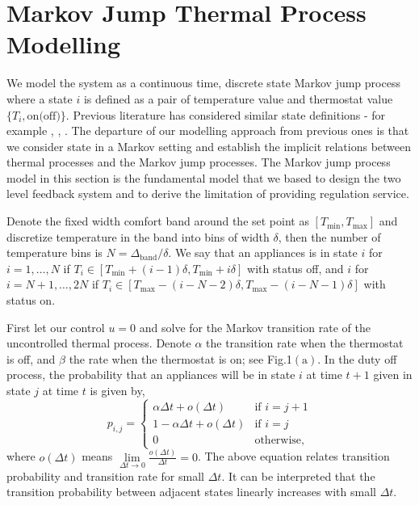 \documentclass[journal]{IEEEtran}
\begin{document}
\section{Markov Jump Thermal Process Modelling}
\label{markov jump process model}
We model the system as a continuous time, discrete state Markov jump process where a state $i$ is defined as a pair of temperature value and thermostat value $\{T_{i},\textrm{on(off)}\}$. Previous literature has considered similar state definitions - for example \cite{chassin1}, \cite{chassin2}, \cite{duncan2}. The departure of our modelling approach from previous ones is that we consider state in a Markov setting and establish the implicit relations between thermal processes and the Markov jump processes. The Markov jump process model in this section is the fundamental model that we based to design the two level feedback system and to derive the limitation of providing regulation service.

Denote the fixed width comfort band around the set point as $[T_{\textrm{min}},T_{\textrm{max}}]$ and discretize temperature in the band into bins of width $\delta$, then the number of temperature bins is $N=\Delta_{\textrm{band}}/\delta$. We say that an appliances is in state $i$ for $i=1,\ldots,N$ if $T_{i}\in [T_{\textrm{min}}+(i-1)\delta,T_{\textrm{min}}+i\delta]$ with status off, and $i$ for $i=N+1,\ldots,2N$ if $T_{i}\in [T_{\textrm{max}}-(i-N-2)\delta,T_{\textrm{max}}-(i-N-1)\delta]$ with status on.

First let our control $u=0$ and solve for the Markov transition rate of the uncontrolled thermal process. Denote $\alpha$ the transition rate when the thermostat is off, and $\beta$ the rate when the thermostat is on; see Fig.1$(\textrm{a})$. In the duty off process, the probability that an appliances will be in state $i$ at time $t+1$ given in state $j$ at time $t$ is given by,
\begin{equation}
\label{def_rate}
p_{i,j}= \left\{
\begin{array}{ll}
\alpha \Delta t + o(\Delta t) & \textrm{if $i=j+1$} \\
1-\alpha \Delta t + o(\Delta t) & \textrm{if $i=j$} \\
0 & \textrm{otherwise},
\end{array}
\right.
\end{equation}
where $o(\Delta t)$ means $\lim\limits_{\Delta t\rightarrow 0} \frac{o(\Delta t)}{\Delta t}=0$. The above equation relates transition probability and transition rate for small $\Delta t$. It can be interpreted that the transition probability between adjacent states linearly increases with small $\Delta t$. 
\end{document}
